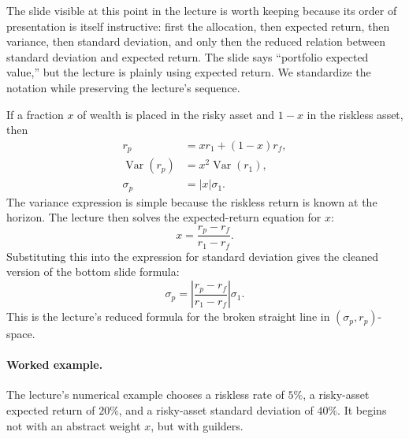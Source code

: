 The slide visible at this point in the lecture is worth keeping because its order of presentation is itself instructive: first the allocation, then expected return, then variance, then standard deviation, and only then the reduced relation between standard deviation and expected return. The slide says ``portfolio expected value,'' but the lecture is plainly using expected return. We standardize the notation while preserving the lecture's sequence.

If a fraction \(x\) of wealth is placed in the risky asset and \(1-x\) in the riskless asset, then
\begin{align}
r_p &= x r_1 + (1-x)r_f, \\
\operatorname{Var}(r_p) &= x^2 \operatorname{Var}(r_1), \\
\sigma_p &= |x| \sigma_1.
\end{align}
The variance expression is simple because the riskless return is known at the horizon. The lecture then solves the expected-return equation for \(x\):
\begin{equation}
x = \frac{r_p-r_f}{r_1-r_f}.
\end{equation}
Substituting this into the expression for standard deviation gives the cleaned version of the bottom slide formula:
\begin{equation}
\sigma_p
=
\left|
\frac{r_p-r_f}{r_1-r_f}
\right|
\sigma_1.
\end{equation}
This is the lecture's reduced formula for the broken straight line in \((\sigma_p,r_p)\)-space.

\paragraph{Worked example.}
The lecture's numerical example chooses a riskless rate of \(5\%\), a risky-asset expected return of \(20\%\), and a risky-asset standard deviation of \(40\%\). It begins not with an abstract weight \(x\), but with guilders.


